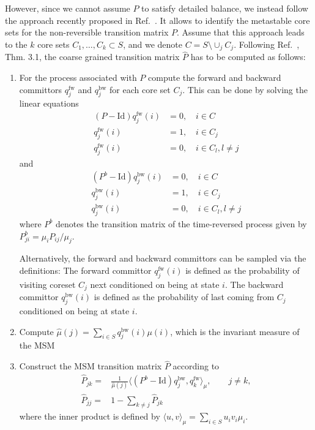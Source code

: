 \documentclass[aps, pre, preprint,unsortedaddress,a4paper,onecolumn]{revtex4}
\newcommand{\vect}[1]{#1}
\newcommand{\fwd}[0]{\textrm{fw}}
\newcommand{\bwd}[0]{\textrm{bw}}
\newcommand{\id}{\mathrm{Id}}
\begin{document}
However, since we cannot assume $P$ to satisfy detailed balance, we
instead follow the approach recently proposed in Ref.~\cite{sarich2014utilizing}.
It allows to identify the metastable core sets for the
non-reversible transition matrix $P$. Assume that this approach leads
to the $k$ core sets $C_1,\ldots, C_k\subset S$, and we denote $C=S\setminus\cup_j C_j$. Following
Ref.~\cite{djurdjevac2010markov}, Thm. 3.1, the coarse grained transition
matrix $\hat{P}$ has to be computed as follows:
\begin{enumerate}
\item For the process associated with $P$ compute the forward and backward committors $q^\fwd_j$ and $q^\bwd_j$  for each core set $C_j$. This can be done by solving the linear equations
\begin{align}
(P-\id) q^\fwd_j(i) & =  0, \quad i\in C\\
q^\fwd_j(i) & =  1,\quad i\in C_j\\
q^\fwd_j(i) & =  0,\quad i\in C_l,l\not=j
\end{align}
and
\begin{align}
(P^b-\id) q^\bwd_j(i) & =  0, \quad i\in C\\
q^\bwd_j(i) & =  1,\quad i\in C_j\\
q^\bwd_j(i) & =  0,\quad i\in C_l,l\not=j
\end{align}
where $P^b$ denotes the transition matrix of the time-reversed process
given by $P^b_{ji}=\mu_i P_{ij}/\mu_j$.

Alternatively, the forward and
backward committors can be sampled via the definitions: The forward
committor $q^\fwd_j(i)$ is defined as the probability of visiting coreset
$C_j$ next conditioned on being at state $i$.  The
backward committor $q^\bwd_j(i)$  is defined as the probability
of last coming from $C_j$ conditioned on being at state $i$.
\item Compute $\hat{\mu}(j)=\sum_{i\in S} q^\bwd_j(i)\mu(i)$,
  which is the invariant measure of the MSM
\item Construct the MSM transition matrix $\hat{P}$ according to
  \begin{align}
    \label{eq:msm-tmatrix}
    \hat{\vect P}_{jk}
    = &
    \frac{1}{\hat{\mu}(j)}
    \langle (\vect P^b - \id) q^\bwd_j,q^\fwd_k \rangle_\mu,\qquad j\not= k, \\
    \hat{\vect P}_{jj}
    =&
    1-\sum_{k\not=j} \hat{\vect P}_{jk}
  \end{align}
where the inner product is defined by
$\langle u,v \rangle_\mu=\sum_{i\in S} u_i v_i \mu_i$.
\end{enumerate}
\end{document}
